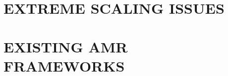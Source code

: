 \documentclass[14pt,letter]{article}
\begin{document}

\section{EXTREME SCALING ISSUES} \label{s:issues}


\section{EXISTING AMR FRAMEWORKS} \label{s:review}
\end{document}
